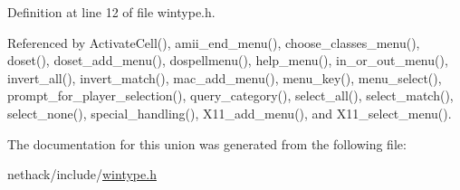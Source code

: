 Definition at line 12 of file wintype.\+h.



Referenced by Activate\+Cell(), amii\+\_\+end\+\_\+menu(), choose\+\_\+classes\+\_\+menu(), doset(), doset\+\_\+add\+\_\+menu(), dospellmenu(), help\+\_\+menu(), in\+\_\+or\+\_\+out\+\_\+menu(), invert\+\_\+all(), invert\+\_\+match(), mac\+\_\+add\+\_\+menu(), menu\+\_\+key(), menu\+\_\+select(), prompt\+\_\+for\+\_\+player\+\_\+selection(), query\+\_\+category(), select\+\_\+all(), select\+\_\+match(), select\+\_\+none(), special\+\_\+handling(), X11\+\_\+add\+\_\+menu(), and X11\+\_\+select\+\_\+menu().



The documentation for this union was generated from the following file\+:\begin{DoxyCompactItemize}
\item 
nethack/include/\hyperlink{wintype_8h}{wintype.\+h}\end{DoxyCompactItemize}
